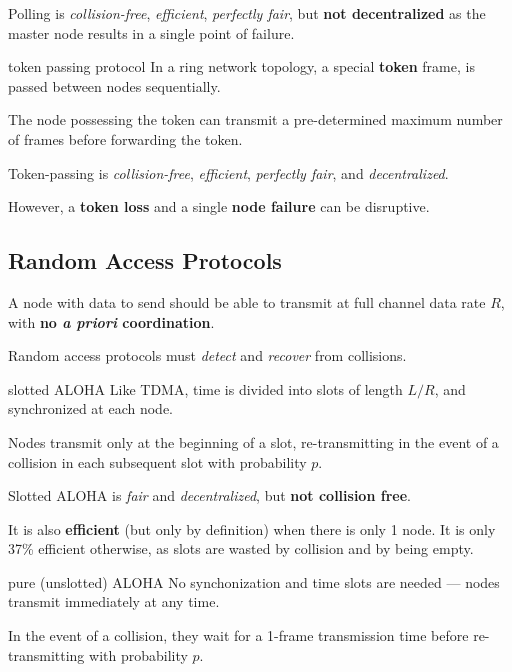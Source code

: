 Polling is \textit{collision-free}, \textit{efficient}, \textit{perfectly fair},
but \textbf{not decentralized} as the master node results in a single point of failure.

\begin{defn}{token passing protocol}
    In a ring network topology, a special \textbf{token} frame, is passed between
    nodes sequentially.

    The node possessing the token can transmit a pre-determined maximum number of frames
    before forwarding the token.
\end{defn}

Token-passing is \textit{collision-free}, \textit{efficient}, \textit{perfectly fair}, and \textit{decentralized}.

However, a \textbf{token loss} and a single \textbf{node failure} can be disruptive.

\subsection{Random Access Protocols}
A node with data to send should be able to transmit at full channel data rate $R$,
with \textbf{no \textit{a priori} coordination}.

Random access protocols must \textit{detect} and \textit{recover} from collisions.

\begin{defn}{slotted ALOHA}
    Like TDMA, time is divided into slots of length $L / R$, and synchronized at each node.

    Nodes transmit only at the beginning of a slot, re-transmitting in the event of a collision
    in each subsequent slot with probability $p$.
\end{defn}

Slotted ALOHA is \textit{fair} and \textit{decentralized}, but \textbf{not collision free}.

It is also \textbf{efficient} (but only by definition) when there is only 1 node.
It is only 37\% efficient otherwise, as slots are wasted by collision and by being empty.

\begin{defn}{pure (unslotted) ALOHA}
    No synchonization and time slots are needed --- nodes transmit immediately at any time.

    In the event of a collision, they wait for a 1-frame transmission time 
    before re-transmitting with probability $p$.
\end{defn}


